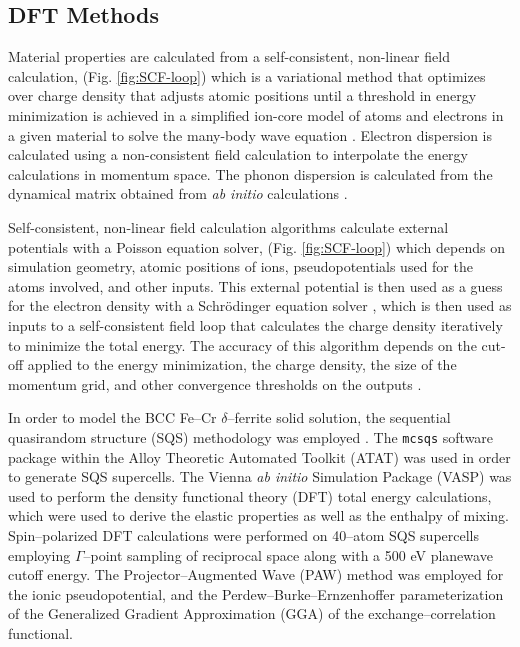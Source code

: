 \documentclass[final,3p,times]{elsarticle}
\begin{document}
\subsection{DFT Methods}
Material properties are calculated from a self-consistent, non-linear field calculation, (Fig. \ref{fig:SCF-loop}) which is a variational method that optimizes over charge density that adjusts atomic positions until a threshold in energy minimization is achieved in a simplified ion-core model of atoms and electrons in a given material to solve the many-body wave equation \cite{Schwingenschloegl2004}. Electron dispersion is calculated using a non-consistent field calculation to interpolate the energy calculations in momentum space. The phonon dispersion is calculated from the dynamical matrix obtained from \textit{ab initio} calculations \cite{hung2022quantum, giustino2014materials}.

Self-consistent, non-linear field calculation algorithms calculate external potentials with a Poisson equation solver, (Fig. \ref{fig:SCF-loop}) which depends on simulation geometry, atomic positions of ions, pseudopotentials used for the atoms involved, and other inputs. This external potential is then used as a guess for the electron density with a Schr\"{o}dinger equation solver \cite{giustino2014materials}, which is then used as inputs to a self-consistent field loop that calculates the charge density iteratively to minimize the total energy. The accuracy of this algorithm depends on the cut-off applied to the energy minimization, the charge density, the size of the momentum grid, and other convergence thresholds on the outputs \cite{hung2022quantum, Schwingenschloegl2004, giustino2014materials}.

In order to model the BCC Fe--Cr $\delta$--ferrite solid solution, the sequential quasirandom structure (SQS) methodology was employed \cite{VandeWalleLiu2013}. 
The \texttt{mcsqs} software package within the Alloy Theoretic Automated Toolkit (ATAT) was used in order to generate SQS supercells.
The Vienna \textit{ab initio} Simulation Package (VASP) was used to perform the density functional theory (DFT) total energy calculations, which were used to derive the elastic properties as well as the enthalpy of mixing. 
Spin--polarized DFT calculations were performed on 40--atom SQS supercells employing $\Gamma$--point sampling of reciprocal space along with a 500 eV planewave cutoff energy. 
The Projector--Augmented Wave (PAW) method was employed for the ionic pseudopotential, and the Perdew--Burke--Ernzenhoffer parameterization of the Generalized Gradient Approximation (GGA) of the exchange--correlation functional. 
\end{document}
